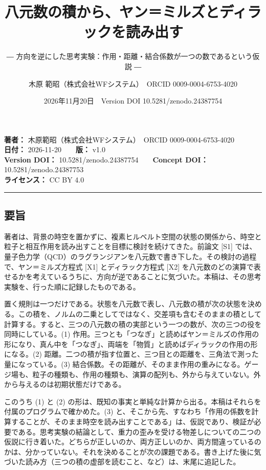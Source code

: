 \documentclass[
  a4paper,
]{ltjsarticle}
\title{八元数の積から、ヤン＝ミルズとディラックを読み出す}
\subtitle{―
方向を逆にした思考実験：作用・距離・結合係数が一つの数であるという仮説
―}
\author{木原 範昭（株式会社WFシステム）　ORCID 0009-0004-6753-4020}
\date{2026年11月20日　Version DOI 10.5281/zenodo.24387754}
\begin{document}
\maketitle

\textbf{著者：} 木原範昭（株式会社WFシステム）　ORCID
0009-0004-6753-4020\\
\textbf{日付：} 2026-11-20　　\textbf{版：} v1.0\\
\textbf{Version DOI：} 10.5281/zenodo.24387754　　\textbf{Concept DOI：}
10.5281/zenodo.24387753\\
\textbf{ライセンス：} CC BY 4.0

\begin{center}\rule{0.5\linewidth}{0.5pt}\end{center}

\subsection{要旨}\label{ux8981ux65e8}

著者は、背景の時空を置かずに、複素ヒルベルト空間の状態の関係から、時空と粒子と相互作用を読み出すことを目標に検討を続けてきた。前論文
{[}S1{]}
では、量子色力学（QCD）のラグランジアンを八元数で書き下した。その検討の過程で、ヤン＝ミルズ方程式
{[}X1{]} とディラック方程式 {[}X2{]}
を八元数のどの演算で表せるかを考えているうちに、方向が逆であることに気づいた。本稿は、その思考実験を、行った順に記録したものである。

置く規則は一つだけである。状態を八元数で表し、八元数の積が次の状態を決める。この積を、ノルムの二乗としてではなく、交差項も含むそのままの積として計算する。すると、三つの八元数の積の実部という一つの数が、次の三つの役を同時にしている。(1)
作用。三つとも「つなぎ」と読めばヤン＝ミルズの作用の形になり、真ん中を「つなぎ」、両端を「物質」と読めばディラックの作用の形になる。(2)
距離。二つの積が指す位置と、三つ目との距離を、三角法で測った量になっている。(3)
結合係数。その距離が、そのまま作用の重みになる。ゲージ場も、粒子の種類も、作用の種類も、演算の配列も、外から与えていない。外から与えるのは初期状態だけである。

このうち (1) と (2)
の形は、既知の事実と単純な計算から出る。本稿はそれらを付属のプログラムで確かめた。(3)
と、そこから先、すなわち「作用の係数を計算することが、そのまま時空を読み出すことである」は、仮説であり、検証が必要である。思考実験の結論として、重力の歪みを受ける物差しについての二つの仮説に行き着いた。どちらが正しいのか、両方正しいのか、両方間違っているのかは、分かっていない。それを決めることが次の課題である。書き上げた後に気づいた読み方（三つの積の虚部を読むこと、など）は、末尾に追記した。
\end{document}
